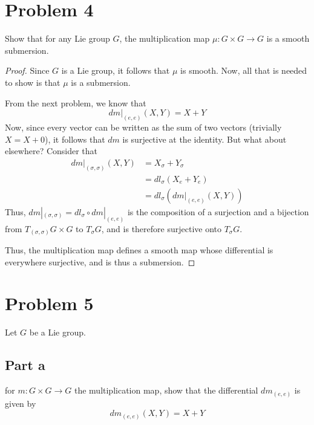 \documentclass[fontsize=11pt]{scrartcl} %
\numberwithin{equation}{section} %
\numberwithin{figure}{section} %
\numberwithin{table}{section} %
\begin{document}
\newpage

\section*{Problem 4}
Show that for any Lie group $G$, the multiplication map $\mu:G\times G\to G$ is
a smooth submersion.
\\
\begin{proof}
Since $G$ is a Lie group, it follows that $\mu$ is smooth. Now, all that is
    needed to show is that $\mu$ is a submersion.

    From the next problem, we know that
    \[
        dm|_{(e,e)}(X,Y) = X+Y
    \]
    Now, since every vector can be written as the sum of two vectors (trivially
    $X=X+0$), it follows that $dm$ is surjective at the identity. But what about
    elsewhere? Consider that
    \[
        \begin{aligned}
            dm|_{(\sigma,\sigma)}(X,Y) &= X_{\sigma} + Y_{\sigma}\\
                                &= dl_{\sigma}(X_e + Y_e)\\
                                &=dl_{\sigma}(dm|_{(e,e)}(X,Y))
        \end{aligned}
    \]
    Thus, $dm|_{(\sigma,\sigma)} = dl_{\sigma}\circ dm|_{(e,e)}$ is the
    composition of a surjection and a bijection from
    $T_{(\sigma,\sigma)}G\times G$ to $T_{\sigma}G$, and is therefore surjective
    onto $T_{\sigma}G$.

    Thus, the multiplication map defines a smooth map whose differential is
    everywhere surjective, and is thus a submersion.
\end{proof}

\newpage

\section*{Problem 5}
Let $G$ be a Lie group.
\subsection*{Part a}
for $m:G\times G\to G$ the multiplication map, show that the differential
$dm_{(e,e)}$ is given by
\[
    dm_{(e,e)}(X,Y) = X+Y
\]
\end{document}
